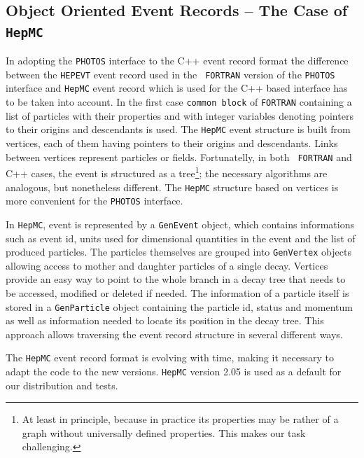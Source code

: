 \documentclass[]{Photos_interface_design}
\begin{document}
\subsection{Object Oriented Event Records  -- The Case of {\tt HepMC}}
 In adopting the {\tt PHOTOS} interface to the C++ event record format
the difference between the {\tt HEPEVT} event record used in the {\tt
  FORTRAN} version of the {\tt PHOTOS} interface and {\tt HepMC} event
record which is used for the C++ based interface has to be taken into
account.  In the first case 
{\tt common block} of {\tt FORTRAN} containing a list of particles with their properties and
with integer variables denoting pointers to their origins and
descendants is used.  The {\tt HepMC} event structure is built from vertices,
each of them having pointers to their origins and descendants. Links
between vertices represent particles or fields.  Fortunatelly, in both {\tt
  FORTRAN} and C++ cases, the event is structured as a
tree\footnote{At least in principle, because in practice its
properties may be rather of a graph without universally defined
properties.  This makes our task challenging.}; the necessary
algorithms are analogous, but nonetheless different. The {\tt HepMC}
structure based on vertices is more convenient for the {\tt PHOTOS}
interface. 

In {\tt HepMC}, event is represented by a {\tt GenEvent} object,
which contains informations such as event id,
units used for dimensional quantities in the event and the list of produced particles. The particles
themselves are grouped into {\tt GenVertex} objects allowing access to mother
and daughter particles of a single decay. Vertices provide an easy way
to point to the whole branch in a decay tree that needs to be accessed,
modified or deleted if needed. The information of a particle  itself is stored
in a {\tt GenParticle} object containing the particle id, status and momentum
as well as information needed to locate its position in the decay tree.
This approach allows traversing the event record structure in several different
ways.

The {\tt HepMC} event record format is  evolving with time, making it necessary
 to adapt
the code to the new versions.
{\tt HepMC} version 2.05 is used as a default for our distribution and tests. 
\end{document}
